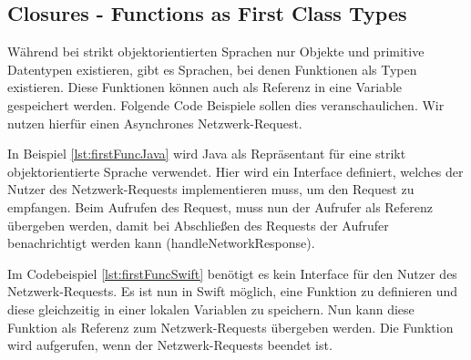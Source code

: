 \subsection{Closures - Functions as First Class Types}
\label{ch:closures}
Während bei strikt objektorientierten Sprachen nur Objekte und primitive Datentypen existieren, gibt es Sprachen, bei denen Funktionen als Typen existieren. Diese Funktionen können auch als Referenz in eine Variable gespeichert werden. Folgende Code Beispiele sollen dies veranschaulichen. Wir nutzen hierfür einen Asynchrones Netzwerk-Request\cite{Apple:2014sp}.

 In Beispiel \ref{lst:firstFuncJava} wird Java als Repräsentant für eine strikt objektorientierte Sprache verwendet. Hier wird ein Interface definiert, welches der Nutzer des Netzwerk-Requests implementieren muss, um den Request zu empfangen. Beim Aufrufen des Request, muss nun der Aufrufer als Referenz übergeben werden, damit bei Abschließen des Requests der Aufrufer benachrichtigt werden kann (handleNetworkResponse). 

Im Codebeispiel \ref{lst:firstFuncSwift} benötigt es kein Interface für den Nutzer des Netzwerk-Requests. Es ist nun in Swift möglich, eine Funktion zu definieren und diese gleichzeitig in einer lokalen Variablen zu speichern. Nun kann diese Funktion als Referenz zum Netzwerk-Requests übergeben werden. Die Funktion wird aufgerufen, wenn der Netzwerk-Requests beendet ist. 

